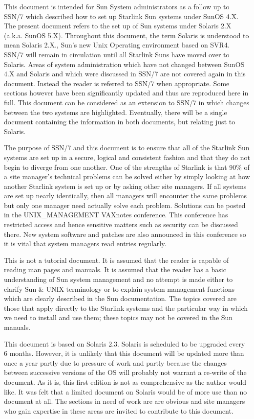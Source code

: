 This document is intended for Sun System administrators
as a follow up to SSN/7 which described how to set up
Starlink Sun systems under SunOS 4.X. The present document refers to the set up
of Sun systems under Solaris 2.X (a.k.a. SunOS 5.X). Throughout this document,
the term Solaris is understood to mean Solaris 2.X., Sun's new Unix Operating
environment based on SVR4. SSN/7 will remain in circulation 
until all Starlink Suns have moved over to Solaris. Areas of system
administration which have not changed  between SunOS 4.X and Solaris and which
were discussed in SSN/7 are not covered again in this document. Instead the
reader is referred to SSN/7 when appropriate. Some sections however have been
significantly updated and thus are reproduced here in full.  This document can
be considered as an  extension to SSN/7 in which changes between the two
systems are highlighted. Eventually, there will be a single document containing
the information in both documents, but relating just to Solaris.

The purpose of SSN/7 and this document is to ensure that all of the Starlink
Sun systems are set up in a secure, logical and consistent fashion and that
they do not begin to diverge from one another. One of the strengths of Starlink
is that 90\% of a site manager's technical problems can be solved either by 
simply looking at how another Starlink system is set up or by asking other site
managers. If all systems are set up nearly identically, then all managers will
encounter the same problems but only one manager need actually solve each
problem. Solutions can be posted in the UNIX\_MANAGEMENT VAXnotes
conference. This conference has restricted access and hence sensitive matters
such as security can be discussed there. New system software and patches are
also announced in this conference so it is vital that system managers read
entries regularly.

This is not a tutorial document. It is assumed that the reader is capable of
reading man pages and manuals.  It is assumed that the reader has a basic
understanding of Sun system management and no attempt is made either to clarify
Sun \& UNIX terminology or to explain system
management functions which are clearly described in the Sun documentation. The
topics covered are those that apply directly to the Starlink systems and the
particular way in which we need to install and use them; these topics may not
be covered in the Sun manuals.

This document is based on Solaris 2.3. Solaris is scheduled to be upgraded
every 6 months. However, it is unlikely that this document will be updated more
than once a year partly due to pressure of work and partly because the changes
between successive versions of the OS will probably not warrant a re-write of
the document. As it is, this first edition is not as comprehensive as the
author would like. It was felt that a limited document on Solaris would be of
more use than no document at all. The sections in need of work are are obvious
and site managers who gain expertise in these areas are invited to contribute
to this document.

